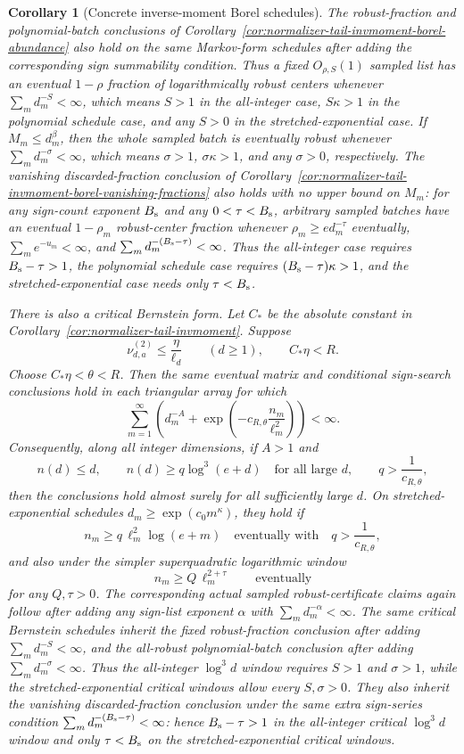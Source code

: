 \documentclass[11pt]{amsart}
\numberwithin{equation}{section}
\newtheorem{corollary}[theorem]{Corollary}
\theoremstyle{definition}
\theoremstyle{remark}
\begin{document}
\begin{corollary}[Concrete inverse-moment Borel schedules]
The robust-fraction and polynomial-batch conclusions of
Corollary~\ref{cor:normalizer-tail-invmoment-borel-abundance} also hold on the
same Markov-form schedules after adding the corresponding sign summability
condition.  Thus a fixed \(O_{\rho,S}(1)\) sampled list has an eventual
\(1-\rho\) fraction of logarithmically robust centers whenever
\(\sum_m d_m^{-S}<\infty\), which means \(S>1\) in the all-integer case,
\(S\kappa>1\) in the polynomial schedule case, and any \(S>0\) in the
stretched-exponential case.  If \(M_m\le d_m^\beta\), then the whole sampled
batch is eventually robust whenever \(\sum_m d_m^{-\sigma}<\infty\), which means
\(\sigma>1\), \(\sigma\kappa>1\), and any \(\sigma>0\), respectively.
The vanishing discarded-fraction conclusion of
Corollary~\ref{cor:normalizer-tail-invmoment-borel-vanishing-fractions} also
holds with no upper bound on \(M_m\): for any sign-count exponent \(B_{\rm s}\)
and any \(0<\tau<B_{\rm s}\), arbitrary sampled batches have an eventual
\(1-\rho_m\) robust-center fraction whenever
\(\rho_m\ge e d_m^{-\tau}\) eventually, \(\sum_m e^{-u_m}<\infty\), and
\(\sum_m d_m^{-(B_{\rm s}-\tau)}<\infty\).  Thus the all-integer case requires
\(B_{\rm s}-\tau>1\), the polynomial schedule case requires
\((B_{\rm s}-\tau)\kappa>1\), and the stretched-exponential case needs only
\(\tau<B_{\rm s}\).

There is also a critical Bernstein form.  Let \(C_*\) be the absolute constant
in Corollary~\ref{cor:normalizer-tail-invmoment}.  Suppose
\[
  \nu_{d,a}^{(2)}\le \frac{\eta}{\ell_d}\qquad(d\ge1),
  \qquad C_*\eta<R.
\]
Choose \(C_*\eta<\theta<R\).  Then the same eventual matrix and conditional
sign-search conclusions hold in each triangular array for which
\[
  \sum_{m=1}^{\infty}
  \left(d_m^{-A}+\exp\left(-c_{R,\theta}\frac{n_m}{\ell_m^2}\right)\right)
  <\infty .
\]
Consequently, along all integer dimensions, if \(A>1\) and
\[
  n(d)\le d,\qquad n(d)\ge q\log^3(e+d)\quad\text{for all large }d,
  \qquad q>\frac1{c_{R,\theta}},
\]
then the conclusions hold almost surely for all sufficiently large \(d\).  On
stretched-exponential schedules \(d_m\ge\exp(c_0m^\kappa)\), they hold if
\[
  n_m\ge q\,\ell_m^2\log(e+m)
  \quad\text{eventually with}\quad q>\frac1{c_{R,\theta}},
\]
and also under the simpler superquadratic logarithmic window
\[
  n_m\ge Q\,\ell_m^{2+\tau}
  \qquad\text{eventually}
\]
for any \(Q,\tau>0\).  The corresponding actual sampled robust-certificate
claims again follow after adding any sign-list exponent \(\alpha\) with
\(\sum_m d_m^{-\alpha}<\infty\).
The same critical Bernstein schedules inherit the fixed robust-fraction
conclusion after adding \(\sum_m d_m^{-S}<\infty\), and the all-robust
polynomial-batch conclusion after adding \(\sum_m d_m^{-\sigma}<\infty\).  Thus
the all-integer \(\log^3d\) window requires \(S>1\) and \(\sigma>1\), while the
stretched-exponential critical windows allow every \(S,\sigma>0\).
They also inherit the vanishing discarded-fraction conclusion under the same
extra sign-series condition \(\sum_m d_m^{-(B_{\rm s}-\tau)}<\infty\): hence
\(B_{\rm s}-\tau>1\) in the all-integer critical \(\log^3d\) window and only
\(\tau<B_{\rm s}\) on the stretched-exponential critical windows.
\end{corollary}
\end{document}
